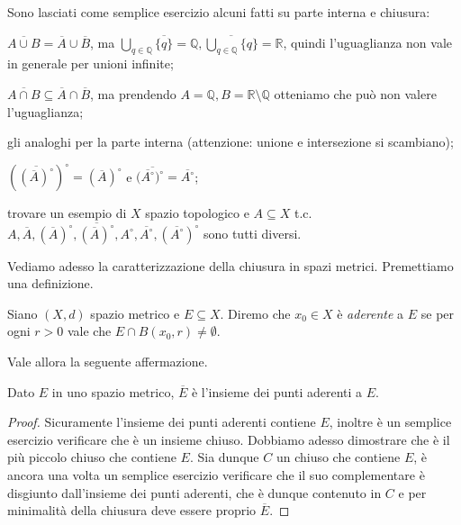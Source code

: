 \begin{exc}
  Sono lasciati come semplice esercizio alcuni fatti su parte interna e chiusura:
  \begin{nlist}
    \item $\overline{A \cup B}=\overline{A} \cup \overline{B}$, ma $\displaystyle \bigcup_{q \in \mathbb{Q}} \overline{\{q\}}=\mathbb{Q}, \overline{\bigcup_{q \in \mathbb{Q}}\{q\}}=\mathbb{R}$, quindi l'uguaglianza non vale in generale per unioni infinite;
    \item $\overline{A \cap B} \subseteq \overline{A} \cap \overline{B}$, ma prendendo $A=\mathbb{Q}, B=\mathbb{R} \setminus \mathbb{Q}$ otteniamo che può non valere l'uguaglianza;
    \item gli analoghi per la parte interna (attenzione: unione e intersezione si scambiano);
    \item $\left(\overline{(\overline{A})^{\circ}}\right)^{\circ}=(\overline{A})^{\circ}$ e $(\overline{\overline{A^{\circ}})^{\circ}}=\overline{A^{\circ}}$;
    \item trovare un esempio di $X$ spazio topologico e $A \subseteq X$ t.c. \\ $A, \overline{A}, (\overline{A})^{\circ}, \overline{(\overline{A})^{\circ}}, A^{\circ}, \overline{A^{\circ}}, (\overline{A^{\circ}})^{\circ}$ sono tutti diversi.
  \end{nlist}
\end{exc}

Vediamo adesso la caratterizzazione della chiusura in spazi metrici. Premettiamo una definizione.

\begin{defn}
  Siano $(X, d)$ spazio metrico e $E \subseteq X$. Diremo che $x_0 \in X$ è \textit{aderente} a $E$ se per ogni $r>0$ vale che $E \cap B(x_0, r) \not= \emptyset$.
\end{defn}

Vale allora la seguente affermazione.

\begin{prop}
  Dato $E$ in uno spazio metrico, $\overline{E}$ è l'insieme dei punti aderenti a $E$.
\end{prop}

\begin{proof}
  Sicuramente l'insieme dei punti aderenti contiene $E$, inoltre è un semplice esercizio verificare che è un insieme chiuso. Dobbiamo adesso dimostrare che è il più piccolo chiuso che contiene $E$. Sia dunque $C$ un chiuso che contiene $E$, è ancora una volta un semplice esercizio verificare che il suo complementare è disgiunto dall'insieme dei punti aderenti, che è dunque contenuto in $C$ e per minimalità della chiusura deve essere proprio $\overline{E}$.
\end{proof}
